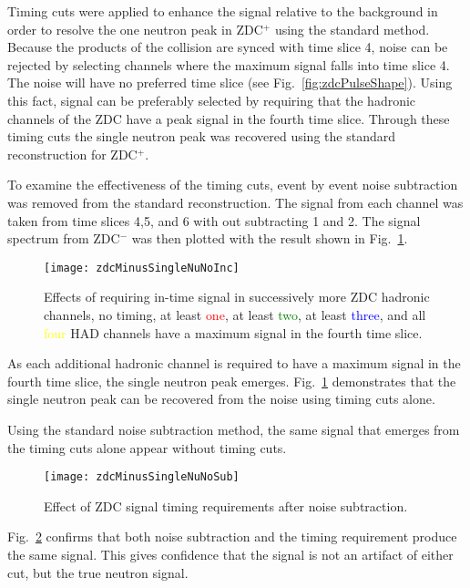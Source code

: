       Timing cuts were applied to enhance the signal relative to the background
        in order to resolve the one neutron peak in ZDC$^{+}$ using the 
        standard method. 
      Because the products of the collision are synced with time slice 4, noise
        can be rejected by selecting channels where the maximum signal falls 
        into time slice 4.
      The noise will have no preferred time slice (see Fig.~\ref{fig:zdcPulseShape}). 
      Using this fact, signal can be preferably selected by requiring that the
        hadronic channels of the ZDC have a peak signal in the fourth time 
        slice.
      Through these timing cuts the single neutron peak was recovered using the
       standard reconstruction for ZDC$^{+}$.

      To examine the effectiveness of the timing cuts, event by event noise 
        subtraction was removed from the standard reconstruction.
      The signal from each channel was taken from time slices 4,5, and 6 with
        out subtracting 1 and 2.
      The signal spectrum from ZDC$^{-}$ was then plotted with the result
        shown in Fig.~\ref{fig:zdcTimingCuts}.
      \begin{figure}[!Hhbt]
        \centering
        \texttt{[image: zdcMinusSingleNuNoInc]}
        \caption{Effects of requiring in-time signal in successively more 
          ZDC hadronic channels, no timing, at least \textcolor{red}{one}, at least \textcolor{green}{two},
            at least \textcolor{blue}{three}, and all \textcolor{yellow}{four} HAD channels have a maximum signal
            in the fourth time slice.}
        \label{fig:zdcTimingCuts}
      \end{figure}
      As each additional hadronic channel is required to have a maximum signal
        in the fourth time slice, the single neutron peak emerges. 
      Fig.~\ref{fig:zdcTimingCuts} demonstrates that the single neutron peak 
        can be recovered from the noise using timing cuts alone. 

      Using the standard noise subtraction method, the same signal that emerges
        from the timing cuts alone appear without timing cuts.
       \begin{figure}[h]
        \centering
        \texttt{[image: zdcMinusSingleNuNoSub]}
        \caption{Effect of ZDC signal timing requirements after noise 
          subtraction.}
        \label{fig:zdcTimingAfterNoiseSub}
      \end{figure}
      Fig.~\ref{fig:zdcTimingAfterNoiseSub} confirms that both noise 
        subtraction and the timing requirement produce the same signal.
      This gives confidence that the signal is not an artifact of either cut, 
        but the true neutron signal.

